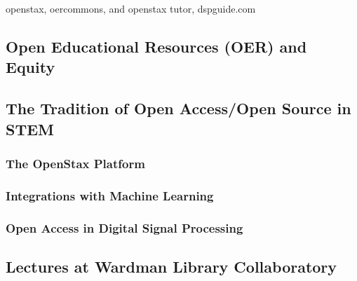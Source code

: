 \documentclass[../../../main.tex]{subfiles}
\begin{document}
openstax, oercommons, and openstax tutor, dspguide.com

\subsection{Open Educational Resources (OER) and Equity}

\subsection{The Tradition of Open Access/Open Source in STEM}

\subsubsection{The OpenStax Platform}

\subsubsection{Integrations with Machine Learning}

\subsubsection{Open Access in Digital Signal Processing}

\subsection{Lectures at Wardman Library Collaboratory}
\end{document}
